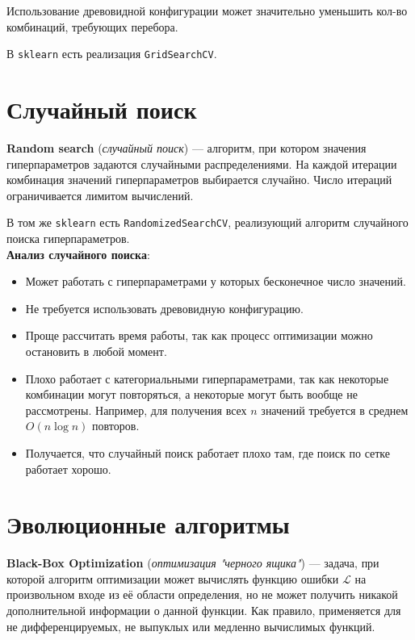 \begin{remark}
    Использование древовидной конфигурации может значительно уменьшить кол-во комбинаций, требующих перебора.
\end{remark}

В \texttt{sklearn} есть реализация \texttt{GridSearchCV}. 

\section{Случайный поиск}

\begin{definition}
    \textbf{Random search} (\textit{случайный поиск}) ---  алгоритм, при котором значения гиперпараметров задаются случайными распределениями. На каждой итерации комбинация значений гиперпараметров выбирается случайно. Число итераций ограничивается лимитом вычислений.
\end{definition}

В том же \texttt{sklearn} есть \texttt{RandomizedSearchCV}, реализующий алгоритм случайного поиска гиперпараметров.\\

\textbf{Анализ случайного поиска}:
\begin{itemize}
    \item Может работать с гиперпараметрами у которых бесконечное число значений.
    \item Не требуется использовать древовидную конфигурацию.
    \item Проще рассчитать время работы, так как процесс оптимизации можно остановить в любой момент.
    \item Плохо работает с категориальными гиперпараметрами, так как некоторые комбинации могут повторяться, а некоторые могут быть вообще не рассмотрены. Например, для получения всех $n$ значений требуется в среднем $O(n\log n)$ повторов.
    \item Получается, что случайный поиск работает плохо там, где поиск по сетке работает хорошо.
\end{itemize}

\section{Эволюционные алгоритмы}

\begin{definition}
    \textbf{Black-Box Optimization} (\textit{оптимизация "черного ящика"}) --- задача, при которой алгоритм оптимизации может вычислять функцию ошибки $\mathcal{L}$ на произвольном входе из её области определения, но не может получить никакой дополнительной информации о данной функции. Как правило, применяется для не дифференцируемых, не выпуклых или медленно вычислимых функций. 
\end{definition}

